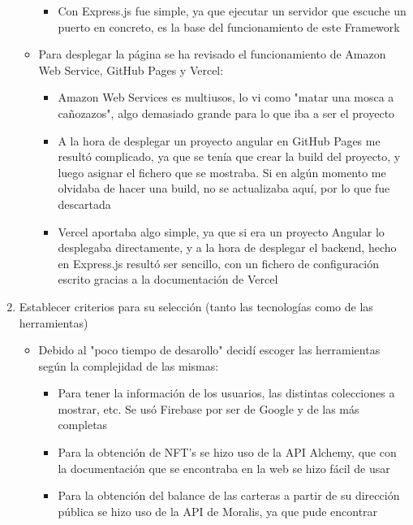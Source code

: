 \begin{enumerate}
\begin{itemize}
\begin{itemize}
            \item Con Express.js fue simple, ya que ejecutar un servidor que escuche un 
            puerto en concreto, es la base del funcionamiento de este Framework
        \end{itemize} 
        \item Para desplegar la página se ha revisado el funcionamiento de Amazon Web 
        Service, GitHub Pages y Vercel:
        \begin{itemize}
            \item Amazon Web Services es multiusos, lo vi como "matar una mosca 
            a cañozazos", algo demasiado grande para lo que iba a ser el proyecto
            \item A la hora de desplegar un proyecto angular en GitHub Pages me 
            resultó complicado, ya que se tenía que crear la build del 
            proyecto, y luego asignar el fichero que se mostraba. 
            Si en algún momento me olvidaba de hacer una build, no se actualizaba 
            aquí, por lo que fue descartada
            \item Vercel aportaba algo simple, ya que si era un proyecto Angular 
            lo desplegaba directamente, y a la hora de desplegar el backend, hecho en Express.js 
            resultó ser sencillo, con un fichero de configuración escrito gracias a la 
            documentación de Vercel 
        \end{itemize} 
    \end{itemize}
    \item Establecer criterios para su selección (tanto las tecnologías como de las herramientas)
    \begin{itemize}
        \item Debido al "poco tiempo de desarollo" decidí escoger las herramientas según 
        la complejidad de las mismas:
        \begin{itemize}
            \item Para tener la información de los usuarios, las distintas 
            colecciones a mostrar, etc. Se usó Firebase por ser de Google y 
            de las más completas
            \item Para la obtención de NFT's se hizo uso de la API Alchemy, 
            que con la documentación que se encontraba en la web se hizo fácil de usar
            \item Para la obtención del balance de las carteras a partir de su 
            dirección pública se hizo uso de la API de Moralis, ya que pude encontrar 

\end{itemize}
\end{itemize}
\end{enumerate}
